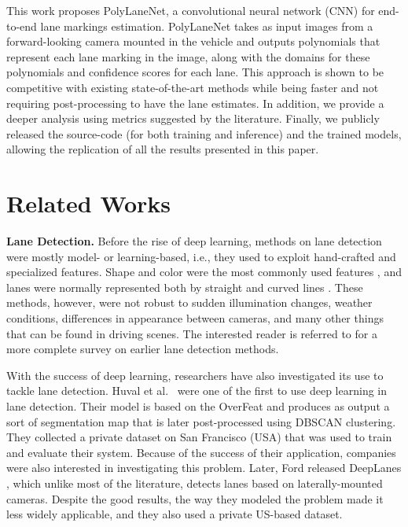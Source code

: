 \documentclass[a4paper,conference]{IEEEtran}
\newcommand{\methodname}{PolyLaneNet}
\begin{document}
This work proposes \methodname{}, a convolutional neural network (CNN) for end-to-end lane markings estimation. \methodname{} takes as input images from a forward-looking camera mounted in the vehicle and outputs polynomials that represent each lane marking in the image, along with the domains for these polynomials and confidence scores for each lane. This approach is shown to be competitive with existing state-of-the-art methods while being faster and not requiring post-processing to have the lane estimates. In addition, we provide a deeper analysis using metrics suggested by the literature. Finally, we publicly released the source-code (for both training and inference) and the trained models, allowing the replication of all the results presented in this paper.

 \section{Related Works}

\noindent
\textbf{Lane Detection.} Before the rise of deep learning, methods on lane detection were mostly model- or learning-based, i.e., they used to exploit hand-crafted and specialized features. Shape and color were the most commonly used features \cite{kluge1995iv,chiu2005iv}, and lanes were normally represented both by straight and curved lines \cite{jung2005imavis,berriel2015sibgrapi}. These methods, however, were not robust to sudden illumination changes, weather conditions, differences in appearance between cameras, and many other things that can be found in driving scenes. The interested reader is referred to \cite{survey2006tits} for a more complete survey on earlier lane detection methods.

With the success of deep learning, researchers have also investigated its use to tackle lane detection. Huval et al.~\cite{huval2015empirical} were one of the first to use deep learning in lane detection. Their model is based on the OverFeat and produces as output a sort of segmentation map that is later post-processed using DBSCAN clustering. They collected a private dataset on San Francisco (USA) that was used to train and evaluate their system. Because of the success of their application, companies were also interested in investigating this problem. Later, Ford released DeepLanes \cite{deeplanes2016ford}, which unlike most of the literature, detects lanes based on laterally-mounted cameras. Despite the good results, the way they modeled the problem made it less widely applicable, and they also used a private US-based dataset.
\end{document}
